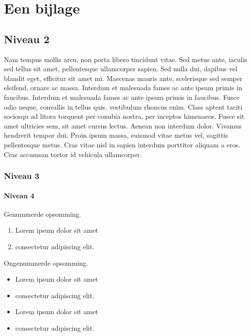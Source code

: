 
\section{Een bijlage} %
\label{sec:een-titel}

\appendix

\renewcommand{\thesubsection}{\Alph{subsection}}

\subsection{Niveau 2} %
\label{sub:nog-een-titel}

Nam tempus mollis arcu, non porta libero tincidunt vitae. Sed metus ante, iaculis sed tellus sit amet, pellentesque ullamcorper sapien. Sed nulla dui, dapibus vel blandit eget, efficitur sit amet mi. Maecenas mauris ante, scelerisque sed semper eleifend, ornare ac massa. Interdum et malesuada fames ac ante ipsum primis in faucibus. Interdum et malesuada fames ac ante ipsum primis in faucibus. Fusce odio neque, convallis in tellus quis, vestibulum rhoncus enim. Class aptent taciti sociosqu ad litora torquent per conubia nostra, per inceptos himenaeos. Fusce sit amet ultricies sem, sit amet cursus lectus. Aenean non interdum dolor. Vivamus hendrerit tempor dui. Proin ipsum massa, euismod vitae metus vel, sagittis pellentesque metus. Cras vitae nisl in sapien interdum porttitor aliquam a eros. Cras accumsan tortor id vehicula ullamcorper.

\subsubsection{Niveau 3}

\paragraph{Niveau 4}

Genummerde opsomming.

\begin{enumerate}
  \item Lorem ipsum dolor sit amet
  \item consectetur adipiscing elit.
\end{enumerate}

Ongenummerde opsomming.

\begin{itemize}
  \item Lorem ipsum dolor sit amet
  \item consectetur adipiscing elit.
  \item Lorem ipsum dolor sit amet
  \item consectetur adipiscing elit.
\end{itemize}
